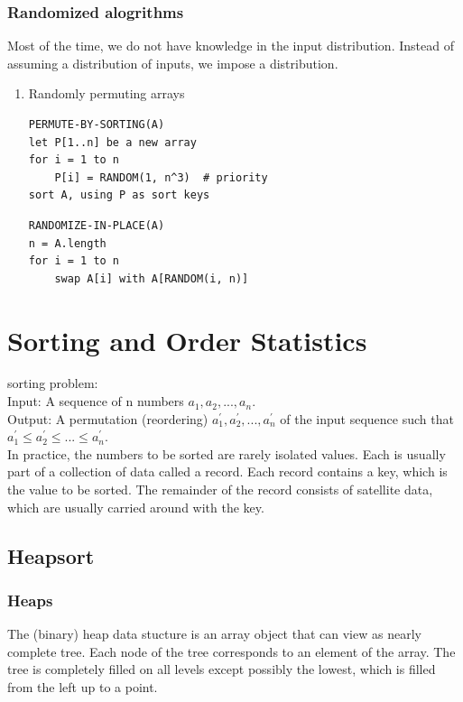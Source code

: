 \documentclass[11pt]{article}
\begin{document}
\subsubsection{Randomized alogrithms}
\label{sec-2-5-2}
Most of the time, we do not have knowledge in the input distribution. Instead of assuming a distribution of inputs, we impose a distribution. \\

\begin{enumerate}
\item Randomly permuting arrays
\label{sec-2-5-2-1}
\begin{verbatim}
PERMUTE-BY-SORTING(A)
let P[1..n] be a new array
for i = 1 to n
    P[i] = RANDOM(1, n^3)  # priority
sort A, using P as sort keys
\end{verbatim}

\begin{verbatim}
RANDOMIZE-IN-PLACE(A)
n = A.length
for i = 1 to n
    swap A[i] with A[RANDOM(i, n)]
\end{verbatim}
\end{enumerate}

\section{Sorting and Order Statistics}
\label{sec-3}
sorting problem: \\

Input: A sequence of n numbers $a_1, a_2, ..., a_n$. \\
Output: A permutation (reordering) $a^'_1,a_2^',...,a_n^'$ of the input sequence such that $a_1^' \le a_2^' \le ... \le a_n^'$. \\

In practice, the numbers to be sorted are rarely isolated values. Each is usually part of a collection of data called a record. Each record contains a key, which is the value to be sorted. The remainder of the record consists of satellite data, which are usually carried around with the key. \\

\subsection{Heapsort}
\label{sec-3-1}

\subsubsection{Heaps}
\label{sec-3-1-1}
The (binary) heap data stucture is an array object that can view as nearly complete tree. Each node of the tree corresponds to an element of the array. The tree is completely filled on all levels except possibly the lowest, which is filled from the left up to a point. \\
\end{document}
